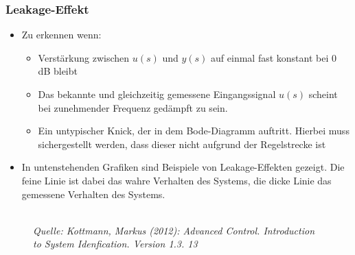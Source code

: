 \subsubsection{Leakage-Effekt}
\begin{itemize}
	\item Zu erkennen wenn:
	\begin{itemize}
		\item Verstärkung zwischen $u(s)$ und $y(s)$ auf einmal fast konstant bei 0 dB bleibt 
		\item Das bekannte und gleichzeitig gemessene Eingangssignal $u(s)$ scheint bei zunehmender Frequenz gedämpft zu sein. 
		\item Ein untypischer Knick, der in dem Bode-Diagramm auftritt. Hierbei muss sichergestellt werden, dass dieser nicht aufgrund der Regelstrecke ist
	\end{itemize}
	\item In untenstehenden Grafiken sind Beispiele von Leakage-Effekten gezeigt. Die feine Linie ist dabei das wahre Verhalten des Systems, die dicke Linie das gemessene Verhalten des Systems.
\end{itemize}
\begin{figure}[!ht]
	\centering
	\\
	\textit{Quelle: Kottmann, Markus (2012): Advanced Control. Introduction to System Idenfication. Version 1.3. 13}
	\label{fig:Leakage}
\end{figure}

